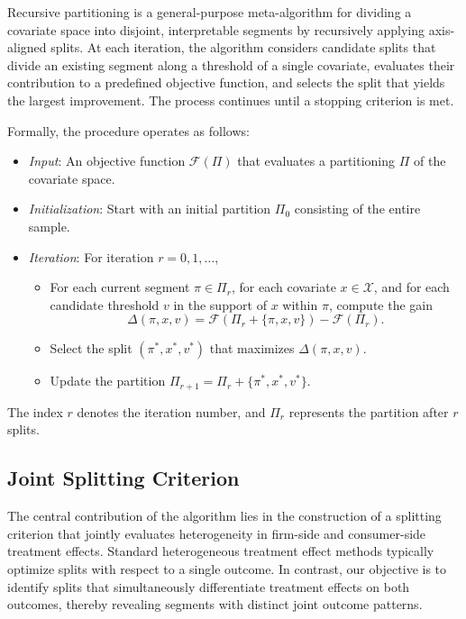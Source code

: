 \documentclass[11pt,letterpaper,english]{article}
\theoremstyle{definition}
\theoremstyle{definition}
\begin{document}
\begin{bibunit}
Recursive partitioning is a general-purpose meta-algorithm for dividing a covariate space into disjoint, interpretable segments by recursively applying axis-aligned splits. At each iteration, the algorithm considers candidate splits that divide an existing segment along a threshold of a single covariate, evaluates their contribution to a predefined objective function, and selects the split that yields the largest improvement. The process continues until a stopping criterion is met.

Formally, the procedure operates as follows:
\begin{itemize}
    \item \emph{Input}: An objective function $\mathcal{F}(\Pi)$ that evaluates a partitioning $\Pi$ of the covariate space.
    \item \emph{Initialization}: Start with an initial partition $\Pi_0$ consisting of the entire sample.
    \item \emph{Iteration}: For iteration $r=0,1,\dots$,
    \begin{itemize}
        \item For each current segment $\pi \in \Pi_r$, for each covariate $x \in \mathcal{X}$, and for each candidate threshold $v$ in the support of $x$ within $\pi$, compute the gain
        \[
        \Delta(\pi,x,v) = \mathcal{F}(\Pi_r + \{\pi,x,v\}) - \mathcal{F}(\Pi_r).
        \]
        \item Select the split $(\pi^*,x^*,v^*)$ that maximizes $\Delta(\pi,x,v)$.
        \item Update the partition $\Pi_{r+1} = \Pi_r + \{\pi^*,x^*,v^*\}$.
    \end{itemize}
\end{itemize}

The index $r$ denotes the iteration number, and $\Pi_r$ represents the partition after $r$ splits.

\subsection{Joint Splitting Criterion}
\label{sec:spliting_criterion}

The central contribution of the algorithm lies in the construction of a splitting criterion that jointly evaluates heterogeneity in firm-side and consumer-side treatment effects. Standard heterogeneous treatment effect methods typically optimize splits with respect to a single outcome. In contrast, our objective is to identify splits that simultaneously differentiate treatment effects on both outcomes, thereby revealing segments with distinct joint outcome patterns.


\end{bibunit}
\end{document}
